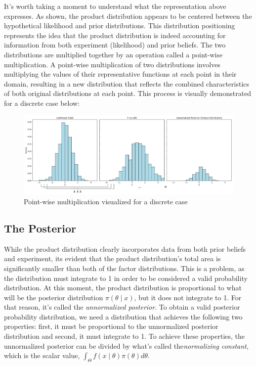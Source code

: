 \documentclass[12pt]{article}
\begin{document}
\noindent It's worth taking a moment to understand what the representation above expresses. As shown, the product distribution appears to be centered between the hypothetical likelihood and prior distributions. This distribution positioning represents the idea that the product distribution is indeed accounting for information from both experiment (likelihood) and prior beliefs. The two distributions are multiplied together by an operation called a point-wise multiplication. A point-wise multiplication of two distributions involves multiplying the values of their representative functions at each point in their domain, resulting in a new distribution that reflects the combined characteristics of both original distributions at each point. This process is visually demonstrated for a discrete case below:

\begin{figure}[h!]
\centering
\includegraphics[width=1.0\textwidth]{assets/visual_9.png} 
\caption{Point-wise multiplication visualized for a discrete case}
\label{fig:cond_prob}
\end{figure}

\subsection*{The Posterior}
\noindent While the product distribution clearly incorporates data from both prior beliefs and experiment, its evident that the product distribution's total area is significantly smaller than both of the factor distributions. This is a problem, as the distribution must integrate to 1 in order to be considered a valid probability distribution. At this moment, the product distribution is proportional to what will be the posterior distribution $\pi(\theta \mid x)$, but it does not integrate to 1. For that reason, it's called the \textit{unnormalized posterior}. To obtain a valid posterior probability distribution, we need a distribution that achieves the following two properties: first, it must be proportional to the unnormalized posterior distribution and second, it must integrate to 1. To achieve these properties, the unnormalized posterior can be divided by what's called the\textit{normalizing constant}, which is the scalar value, $\int_{\Theta} f(x \mid \theta) \pi(\theta) d\theta$.\\
\end{document}
